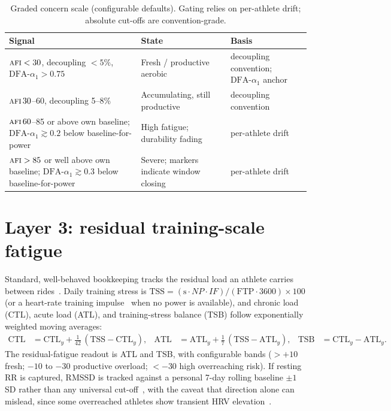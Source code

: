 \documentclass[11pt]{article}
\newcommand{\afi}{\textup{\textsc{afi}}}
\newcommand{\aone}{\ensuremath{\text{DFA-}\alpha_1}}
\begin{document}
\begin{table}[h]
\centering
\footnotesize
\caption{Graded concern scale (configurable defaults). Gating relies on per-athlete drift; absolute cut-offs are convention-grade.}
\label{tab:bands}
\begin{tabularx}{\linewidth}{@{}>{\raggedright\arraybackslash}X >{\raggedright\arraybackslash}X l@{}}
\toprule
\textbf{Signal} & \textbf{State} & \textbf{Basis} \\
\midrule
$\afi<30$, decoupling ${<}5\%$, $\aone>0.75$ & Fresh / productive aerobic & decoupling convention; $\aone$ anchor \\
$\afi\,30$--60, decoupling 5--8\% & Accumulating, still productive & decoupling convention \\
$\afi\,60$--85 or above own baseline; $\aone\gtrsim 0.2$ below baseline-for-power & High fatigue; durability fading & per-athlete drift \\
$\afi>85$ or well above own baseline; $\aone\gtrsim 0.3$ below baseline-for-power & Severe; markers indicate window closing & per-athlete drift \\
\bottomrule
\end{tabularx}
\end{table}

\section{Layer 3: residual training-scale fatigue}\label{sec:layer3}

Standard, well-behaved bookkeeping tracks the residual load an athlete carries between rides~\cite{trainingpeaks}. Daily training stress is $\text{TSS} = (\text{s}\cdot NP\cdot IF)/(\text{FTP}\cdot 3600)\times 100$ (or a heart-rate training impulse~\cite{banister} when no power is available), and chronic load (CTL), acute load (ATL), and training-stress balance (TSB) follow exponentially weighted moving averages:
\begin{align}
\text{CTL} &= \text{CTL}_y + \tfrac{1}{42}\,(\text{TSS}-\text{CTL}_y), &
\text{ATL} &= \text{ATL}_y + \tfrac{1}{7}\,(\text{TSS}-\text{ATL}_y), &
\text{TSB} &= \text{CTL}_y - \text{ATL}_y.
\label{eq:ctl}
\end{align}
The residual-fatigue readout is ATL and TSB, with configurable bands ($>{+}10$ fresh; $-10$ to $-30$ productive overload; ${<}-30$ high overreaching risk). If resting RR is captured, RMSSD is tracked against a personal 7-day rolling baseline $\pm1$\,SD rather than any universal cut-off~\cite{rmssd}, with the caveat that direction alone can mislead, since some overreached athletes show transient HRV elevation~\cite{meeusen}.
\end{document}
